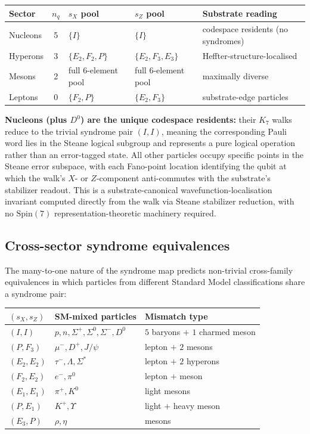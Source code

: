 \documentclass[11pt]{article}
\begin{document}
\begin{center}
\begin{tabular}{lclll}
\toprule
Sector & $n_q$ & $s_X$ pool & $s_Z$ pool & Substrate reading \\
\midrule
Nucleons & 5 & $\{I\}$ & $\{I\}$ & codespace residents (no syndromes) \\
Hyperons & 3 & $\{E_2, F_2, P\}$ & $\{E_2, F_3, E_3\}$ & Heffter-structure-localised \\
Mesons   & 2 & full 6-element pool & full 6-element pool & maximally diverse \\
Leptons  & 0 & $\{F_2, P\}$ & $\{E_2, F_3\}$ & substrate-edge particles \\
\bottomrule
\end{tabular}
\end{center}

\textbf{Nucleons (plus $D^0$) are the unique codespace residents:} their $K_7$ walks reduce to the trivial syndrome pair $(I, I)$, meaning the corresponding Pauli word lies in the Steane logical subgroup and represents a pure logical operation rather than an error-tagged state.  All other particles occupy specific points in the Steane error subspace, with each Fano-point location identifying the qubit at which the walk's $X$- or $Z$-component anti-commutes with the substrate's stabilizer readout.  This is a substrate-canonical wavefunction-localisation invariant computed directly from the walk via Steane stabilizer reduction, with no $\mathrm{Spin}(7)$ representation-theoretic machinery required.

\subsection{Cross-sector syndrome equivalences}
\label{sec:syndrome-equivalences}

The many-to-one nature of the syndrome map predicts non-trivial cross-family equivalences in which particles from different Standard Model classifications share a syndrome pair:

\begin{center}
\begin{tabular}{lll}
\toprule
$(s_X, s_Z)$ & SM-mixed particles & Mismatch type \\
\midrule
$(I, I)$    & $p, n, \Sigma^+, \Sigma^0, \Sigma^-, D^0$ & $5$ baryons $+$ $1$ charmed meson \\
$(P, F_3)$  & $\mu^-, D^+, J/\psi$ & lepton $+$ $2$ mesons \\
$(E_2, E_2)$ & $\tau^-, \Lambda, \Sigma^*$ & lepton $+$ $2$ hyperons \\
$(F_2, E_2)$ & $e^-, \pi^0$ & lepton $+$ meson \\
$(E_1, E_1)$ & $\pi^+, K^0$ & light mesons \\
$(P, E_1)$  & $K^+, \Upsilon$ & light $+$ heavy meson \\
$(E_3, P)$  & $\rho, \eta$ & mesons \\
\bottomrule
\end{tabular}
\end{center}
\end{document}
